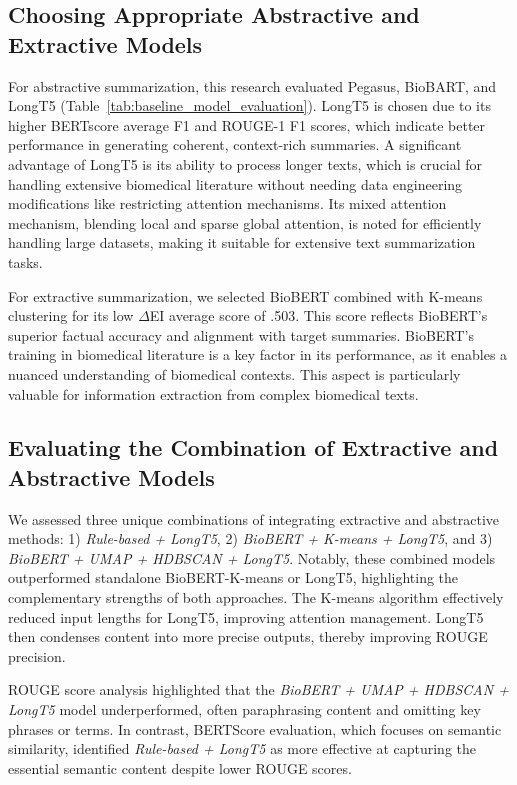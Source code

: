 \documentclass[11pt]{article}
\begin{document}
\subsection{Choosing Appropriate Abstractive and Extractive Models}
For abstractive summarization, this research evaluated Pegasus, BioBART, and LongT5 (Table~\ref{tab:baseline_model_evaluation}). LongT5 is chosen due to its higher BERTscore average F1 and ROUGE-1 F1 scores, which indicate better performance in generating coherent, context-rich summaries. A significant advantage of LongT5 is its ability to process longer texts, which is crucial for handling extensive biomedical literature without needing data engineering modifications like restricting attention mechanisms. Its mixed attention mechanism, blending local and sparse global attention, is noted for efficiently handling large datasets, making it suitable for extensive text summarization tasks.

For extractive summarization, we selected BioBERT combined with K-means clustering for its low $\Delta$EI average score of .503. This score reflects BioBERT's superior factual accuracy and alignment with target summaries. BioBERT's training in biomedical literature is a key factor in its performance, as it enables a nuanced understanding of biomedical contexts. This aspect is particularly valuable for information extraction from complex biomedical texts.


\subsection{Evaluating the Combination of Extractive and Abstractive Models}
We assessed three unique combinations of integrating extractive and abstractive methods: 1) \textit{Rule-based + LongT5}, 2) \textit{BioBERT + K-means + LongT5}, and 3) \textit{BioBERT + UMAP + HDBSCAN + LongT5}. Notably, these combined models outperformed standalone BioBERT-K-means or LongT5, highlighting the complementary strengths of both approaches. The K-means algorithm effectively reduced input lengths for LongT5, improving attention management. LongT5 then condenses content into more precise outputs, thereby improving ROUGE precision.

ROUGE score analysis highlighted that the \textit{BioBERT + UMAP + HDBSCAN + LongT5} model underperformed, often paraphrasing content and omitting key phrases or terms. In contrast, BERTScore evaluation, which focuses on semantic similarity, identified \textit{Rule-based + LongT5} as more effective at capturing the essential semantic content despite lower ROUGE scores.
\end{document}
